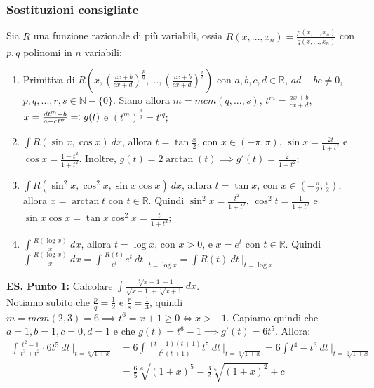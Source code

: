 \documentclass{article}
\begin{document}
\subsubsection{Sostituzioni consigliate}
Sia $R$ una funzione razionale di più variabili, ossia $R(x, ..., x_n) = \frac{p(x, ..., x_n)}{q(x, ..., x_n)}$ con $p, q$ polinomi in $n$ variabili:
\begin{enumerate}
    \item Primitiva di $R(x, (\frac{ax + b}{cx + d})^\frac{p}{q}, ..., (\frac{ax + b}{cx + d})^\frac{r}{s})$ con $a, b, c, d \in \mathbb{R}$, $ad - bc \neq 0$, $p, q, ..., r, s \in \mathbb{N} - \{0\}$. Siano allora $m = mcm(q, ..., s)$, $t^m = \frac{ax + b}{cx + d}$, $x = \frac{dt^m - b}{a - ct^m} =\vcentcolon g(t)$ e $(t^m)^\frac{p}{q} = t^{l q}$;
    \item $\int R(\sin x, \cos x) \ dx$, allora $t = \tan\frac{x}{2}$, con $x \in (-\pi, \pi)$, $\sin x = \frac{2t}{1 + t^2}$ e $\cos x = \frac{1 - t^2}{1 + t^2}$. Inoltre, $g(t) = 2\arctan(t) \implies g'(t) = \frac{2}{1 + t^2}$;
    \item $\int R(\sin^2x, \cos^2x, \sin x\cos x) \ dx$, allora $t = \tan x$, con $x \in (-\frac{\pi}{2}, \frac{\pi}{2})$, allora $x = \arctan t$ con $t \in \mathbb{R}$. Quindi $\sin^2 x = \frac{t^2}{1 + t^2}$, $\cos^2t = \frac{1}{1 + t^2}$ e $\sin x\cos x = \tan x\cos^2x = \frac{t}{1 + t^2}$;
    \item $\int \frac{R(\log x)}{x} \ dx$, allora $t = \log x$, con $x > 0$, e $x = e^t$ con $t \in \mathbb{R}$. Quindi $\int \frac{R(\log x)}{x} \ dx = \int \frac{R(t)}{e^t} e^t \ dt \ \bigg|_{t = \log x} = \int R(t) \ dt \ \bigg|_{t = \log x}$
\end{enumerate}

\noindent\textbf{ES. Punto 1:} Calcolare $\int \frac{\sqrt[3]{x + 1} - 1}{\sqrt{x + 1} + \sqrt[3]{x + 1}} \ dx$.\\
Notiamo subito che $\frac{p}{q} = \frac{1}{2}$ e $\frac{r}{s} = \frac{1}{3}$, quindi $m = mcm(2, 3) = 6 \implies t^6 = x + 1 \geq 0 \iff x >-1$. Capiamo quindi che $a = 1, b = 1, c = 0, d = 1$ e che $g(t) = t^6 - 1 \implies g'(t) = 6t^5$. Allora:
\begin{align*}
    \int \frac{t^2 - 1}{t^3 + t^2} \cdot 6t^5 \ dt \ \bigg|_{t = \sqrt[6]{1 + x}} &= 6\int \frac{(t - 1)(t + 1)}{t^2(t + 1)} t^5 \ dt \ \bigg|_{t = \sqrt[6]{1 + x}} = 6\int t^4 - t^3 \ dt \ \bigg|_{t = \sqrt[6]{1 + x}} \\
    &= \frac{6}{5} \sqrt[6]{(1 + x)^5} - \frac{3}{2} \sqrt[6]{(1 + x)^2} + c
\end{align*}
\end{document}
